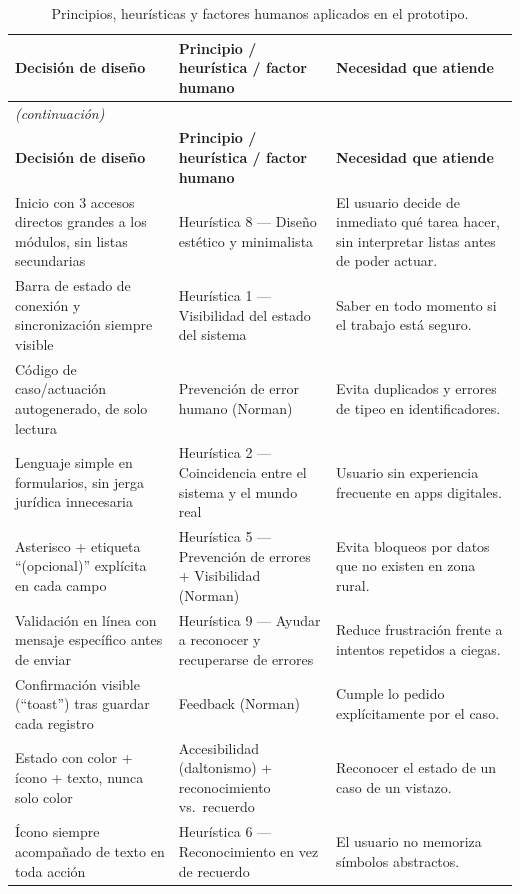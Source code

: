 \documentclass[11pt,a4paper]{article}
\begin{document}
{\small
\begin{longtable}{@{}p{5cm}p{4.3cm}p{6.2cm}@{}}
\caption{Principios, heurísticas y factores humanos aplicados en el prototipo.}\\
\toprule
\textbf{Decisión de diseño} & \textbf{Principio / heurística / factor humano} & \textbf{Necesidad que atiende} \\
\midrule
\endfirsthead
\multicolumn{3}{l}{\textit{(continuación)}} \\
\toprule
\textbf{Decisión de diseño} & \textbf{Principio / heurística / factor humano} & \textbf{Necesidad que atiende} \\
\midrule
\endhead
\bottomrule
\endfoot
Inicio con 3 accesos directos grandes a los módulos, sin listas secundarias & Heurística 8 --- Diseño estético y minimalista & El usuario decide de inmediato qué tarea hacer, sin interpretar listas antes de poder actuar. \\
Barra de estado de conexión y sincronización siempre visible & Heurística 1 --- Visibilidad del estado del sistema & Saber en todo momento si el trabajo está seguro. \\
Código de caso/actuación autogenerado, de solo lectura & Prevención de error humano (Norman) & Evita duplicados y errores de tipeo en identificadores. \\
Lenguaje simple en formularios, sin jerga jurídica innecesaria & Heurística 2 --- Coincidencia entre el sistema y el mundo real & Usuario sin experiencia frecuente en apps digitales. \\
Asterisco + etiqueta \enquote{(opcional)} explícita en cada campo & Heurística 5 --- Prevención de errores + Visibilidad (Norman) & Evita bloqueos por datos que no existen en zona rural. \\
Validación en línea con mensaje específico antes de enviar & Heurística 9 --- Ayudar a reconocer y recuperarse de errores & Reduce frustración frente a intentos repetidos a ciegas. \\
Confirmación visible (\enquote{toast}) tras guardar cada registro & Feedback (Norman) & Cumple lo pedido explícitamente por el caso. \\
Estado con color + ícono + texto, nunca solo color & Accesibilidad (daltonismo) + reconocimiento vs.\ recuerdo & Reconocer el estado de un caso de un vistazo. \\
Ícono siempre acompañado de texto en toda acción & Heurística 6 --- Reconocimiento en vez de recuerdo & El usuario no memoriza símbolos abstractos. \\

\end{longtable}}
\end{document}
